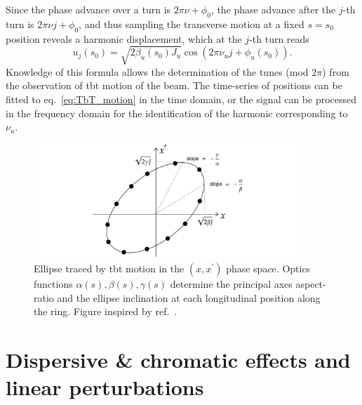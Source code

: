  Since the phase advance over a turn is $2\pi \nu+\phi_0$, the phase advance after the $j$-th turn is $2\pi\nu j+\phi_0$, and thus
 sampling the transverse motion at a fixed $s=s_0$ position reveals a harmonic displacement, which at the $j$-th turn reads
\begin{equation}
    u_j(s_0)=\sqrt{2\beta_u(s_0) J_u}\cos(2\pi\nu_u j+\phi_u(s_0)).
    \label{eq:TbT_motion}
\end{equation}
Knowledge of this formula allows the determination of the tunes (mod $2\pi$) from the observation of \gls*{tbt} motion of the beam. The time-series of positions can be fitted to eq.~\eqref{eq:TbT_motion} in the time domain, or the signal can be processed in the frequency domain for the identification of the harmonic corresponding to $\nu_u$.
\begin{figure}[htb]
    \centering
    \includegraphics[width=0.9\textwidth]{Images/ellipse.pdf}
    \caption[Ellipse traced by TbT motion in the $(x,x^\prime)$ phase space.]{Ellipse traced by \gls*{tbt} motion in the $(x,x^\prime)$ phase space. Optics functions $\alpha(s), \beta(s), \gamma(s)$ determine the principal axes aspect-ratio and the ellipse inclination at each longitudinal position along the ring. Figure inspired by ref.~\cite{wolski_beam_2014}.}
    \label{fig:ellipse}
\end{figure}
\section{Dispersive \& chromatic effects and linear perturbations}
